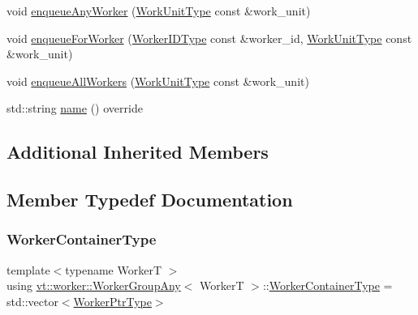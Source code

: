 \begin{DoxyCompactItemize}
\item 
void \hyperlink{structvt_1_1worker_1_1_worker_group_any_a9f8a255853db11824212dcba4faaaf13}{enqueue\+Any\+Worker} (\hyperlink{namespacevt_1_1worker_a59d2fcdafa81fc0af7f921a258e42202}{Work\+Unit\+Type} const \&work\+\_\+unit)
\item 
void \hyperlink{structvt_1_1worker_1_1_worker_group_any_a7f800682c86f876c626d3ee1b9735680}{enqueue\+For\+Worker} (\hyperlink{namespacevt_a656e362091da17b9b93d0655b36e3392}{Worker\+I\+D\+Type} const \&worker\+\_\+id, \hyperlink{namespacevt_1_1worker_a59d2fcdafa81fc0af7f921a258e42202}{Work\+Unit\+Type} const \&work\+\_\+unit)
\item 
void \hyperlink{structvt_1_1worker_1_1_worker_group_any_a87944f965a0e1a918257be0ceff011a5}{enqueue\+All\+Workers} (\hyperlink{namespacevt_1_1worker_a59d2fcdafa81fc0af7f921a258e42202}{Work\+Unit\+Type} const \&work\+\_\+unit)
\item 
std\+::string \hyperlink{structvt_1_1worker_1_1_worker_group_any_a29dc03c300f442508501671d9ec1eecd}{name} () override
\end{DoxyCompactItemize}
\subsection*{Additional Inherited Members}


\subsection{Member Typedef Documentation}
\mbox{\label{structvt_1_1worker_1_1_worker_group_any_ad7e74c099f11c75bc35c838baedaa2cd}} 
\subsubsection{\texorpdfstring{Worker\+Container\+Type}{WorkerContainerType}}
{\footnotesize\ttfamily template$<$typename WorkerT $>$ \\
using \hyperlink{structvt_1_1worker_1_1_worker_group_any}{vt\+::worker\+::\+Worker\+Group\+Any}$<$ WorkerT $>$\+::\hyperlink{structvt_1_1worker_1_1_worker_group_any_ad7e74c099f11c75bc35c838baedaa2cd}{Worker\+Container\+Type} =  std\+::vector$<$\hyperlink{structvt_1_1worker_1_1_worker_group_any_a1c5f50479aa26bcea9491f5ca41138d7}{Worker\+Ptr\+Type}$>$}

